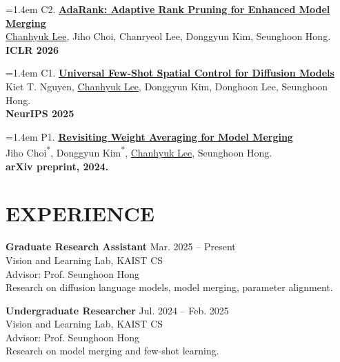 \documentclass[a4paper,10pt]{extarticle}
\newcommand{\entryskip}{\smallskip}
\newcommand{\venue}[1]{\textbf{#1}}
\begin{document}
\noindent\begin{minipage}[t]{\linewidth}
\hangindent=1.4em
C2. \href{https://arxiv.org/abs/2503.22178}{\textbf{AdaRank: Adaptive Rank Pruning for Enhanced Model Merging}} \\[1pt]
\underline{Chanhyuk Lee}, Jiho Choi, Chanryeol Lee, Donggyun Kim, Seunghoon Hong. \\[3pt]
\venue{ICLR 2026}

\vspace{6pt}
\end{minipage}
\noindent\begin{minipage}[t]{\linewidth}
\hangindent=1.4em
C1. \href{http://arxiv.org/abs/2509.07530}{\textbf{Universal Few-Shot Spatial Control for Diffusion Models}} \\[1pt]
Kiet T. Nguyen, \underline{Chanhyuk Lee}, Donggyun Kim, Donghoon Lee, Seunghoon Hong. \\[3pt]
\venue{NeurIPS 2025}

\vspace{6pt}
\end{minipage}
\noindent\begin{minipage}[t]{\linewidth}
\hangindent=1.4em
P1. \href{https://arxiv.org/abs/2412.12153}{\textbf{Revisiting Weight Averaging for Model Merging}} \\[1pt]
Jiho Choi\textsuperscript{*}, Donggyun Kim\textsuperscript{*}, \underline{Chanhyuk Lee}, Seunghoon Hong. \\[3pt]
\venue{arXiv preprint, 2024.}
\end{minipage}

\section*{EXPERIENCE}
\textbf{Graduate Research Assistant} \hfill Mar. 2025 -- Present \\
Vision and Learning Lab, KAIST CS \\
Advisor: Prof. Seunghoon Hong \\
Research on diffusion language models, model merging, parameter alignment.

\entryskip
\textbf{Undergraduate Researcher} \hfill Jul. 2024 -- Feb. 2025 \\
Vision and Learning Lab, KAIST CS \\
Advisor: Prof. Seunghoon Hong \\
Research on model merging and few-shot learning.
\end{document}
